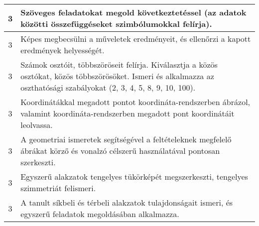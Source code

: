 \begin{longtable}{c | p{12cm} }
                                
                                          3 &  Szöveges feladatokat megold következtetéssel (az adatok közötti összefüggéseket szimbólumokkal felírja). \\ \hline
                                          3 &  Képes megbecsülni a műveletek eredményeit, és ellenőrzi a kapott eredmények helyességét. \\ \hline
                                          3 &  Számok osztóit, többszöröseit felírja. Kiválasztja a közös osztókat, közös többszörösöket. Ismeri és alkalmazza az oszthatósági szabályokat (2, 3, 4, 5, 8, 9, 10, 100). \\ \hline
                                          3 &  Koordinátákkal megadott pontot koordináta-rendszerben ábrázol, valamint koordináta-rendszerben megadott pont koordinátáit leolvassa. \\ \hline
                                          3 &  A geometriai ismeretek segítségével a feltételeknek megfelelő ábrákat körző és vonalzó célszerű használatával pontosan szerkeszti. \\ \hline
                                          3 &  Egyszerű alakzatok tengelyes tükörképét megszerkeszti, tengelyes szimmetriát felismeri. \\ \hline
                                          3 &  A tanult síkbeli és térbeli alakzatok tulajdonságait ismeri, és egyszerű feladatok megoldásában alkalmazza. \\ \hline
                                      

\end{longtable}
